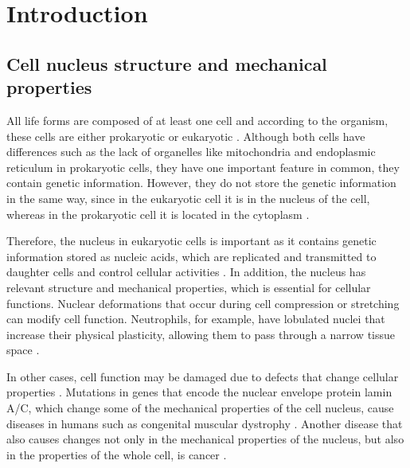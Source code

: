 \documentclass[12pt, a4paper]{article} %
\begin{document}
\section{Introduction}

\subsection{Cell nucleus structure and mechanical properties}

All life forms are composed of at least one cell \cite{mazzarello1999unifying} and according to the organism, these cells are either prokaryotic or eukaryotic \cite{vellai1999origin}. Although both cells have differences such as the lack of organelles like mitochondria \cite{keeling2008organelle} and endoplasmic reticulum \cite{rapoport2007protein} in prokaryotic cells, they have one important feature in common, they contain genetic information. However, they do not store the genetic information in the same way, since in the eukaryotic cell it is in the nucleus of the cell, whereas in the prokaryotic cell it is located in the cytoplasm \cite{cook1983mucus}.

\setlength{\parskip}{4mm}

Therefore, the nucleus in eukaryotic cells is important as it contains genetic information stored as nucleic acids, which are replicated and transmitted to daughter cells and control cellular activities \cite{ossareh2001protein}. In addition, the nucleus has relevant structure and mechanical properties, which is essential for cellular functions. Nuclear deformations that occur during cell compression or stretching can modify cell function. Neutrophils, for example, have lobulated nuclei that increase their physical plasticity, allowing them to pass through a narrow tissue space \cite{hoffmann2011integrin}.

In other cases, cell function may be damaged due to defects that change cellular properties \cite{lammerding2011mechanics}. Mutations in genes that encode the nuclear envelope protein lamin A/C, which change some of the mechanical properties of the cell nucleus, cause diseases in humans such as congenital muscular dystrophy \cite{lammerding2004lamin}. Another disease that also causes changes not only in the mechanical properties of the nucleus, but also in the properties of the whole cell, is cancer \cite{jacobs2012introduction, lekka2019measuring, cross2007nanomechanical}.
\end{document}
